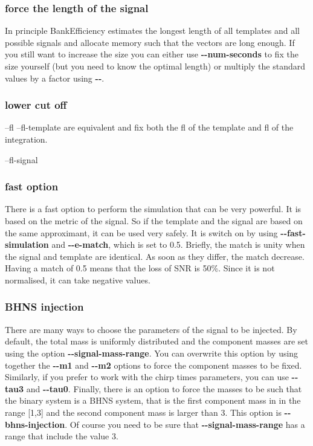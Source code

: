 \documentclass[a4paper,10pt]{article}
\begin{document}
\subsubsection{force the length of the signal}
In principle BankEfficiency estimates the longest length of all templates and all possible signals and allocate memory such that the vectors are long enough. If you still want to increase the size you can either use \textbf{{-}{-}num-seconds} to fix the size yourself (but you need to know the optimal length) or multiply the standard values by a factor using \textbf{{-}{-}}.
\subsubsection{lower cut off}
--fl --fl-template  are equivalent and fix both the fl of the template and fl of the integration.

--fl-signal
\subsubsection{fast option}
There is a fast option to perform the simulation that can be very powerful. It is based on the metric of the signal. So if the template and the signal are based on the same approximant, it can be used very safely. It is switch on by using \textbf{{-}{-}fast-simulation} and \textbf{{-}{-}e-match}, which is set to 0.5. Briefly, the match is unity when the signal and template are identical. As soon as they differ, the match decrease. Having a match of 0.5 means that the loss of SNR is 50\%. Since it is not normalised, it can take negative values.


\subsubsection{BHNS injection}
There are many ways to choose the parameters of the signal to be injected. By default, the total mass is uniformly distributed and the component masses are set using the option \textbf{{-}{-}signal-mass-range}. You can overwrite this option by using together the \textbf{{-}{-}m1} and \textbf{{-}{-}m2} options to force the component masses to be fixed. Similarly, if you prefer to work with the chirp times parameters, you can use 
\textbf{{-}{-}tau3} and \textbf{{-}{-}tau0}. Finally, there is an option to force the masses to be such that the binary system is a BHNS system, that is the first component mass in in the range [1,3] and the second component mass is larger than 3. This option is \textbf{{-}{-}bhns-injection}. Of course you need to be sure that \textbf{{-}{-}signal-mass-range} has a range that include the value 3.
\end{document}
